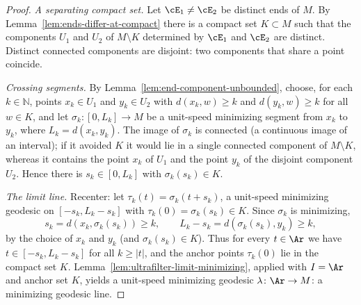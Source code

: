 \begin{proof}
\leanok
{}
{\em A separating compact set.} Let $\cE_1\neq\cE_2$ be distinct
ends of $M$. By Lemma~\ref{lem:ends-differ-at-compact} there is a
compact set $K\subset M$ such that the components $U_1$ and $U_2$
of $M\setminus K$ determined by $\cE_1$ and $\cE_2$ are distinct.
Distinct connected components are disjoint: two components that
share a point coincide.

{\em Crossing segments.} By
Lemma~\ref{lem:end-component-unbounded}, choose, for each
$k\in\mathbb{N}$, points
$x_k\in U_1$ and $y_k\in U_2$ with $d(x_k,w)\ge k$ and $d(y_k,w)\ge
k$ for all $w\in K$, and let $\sigma_k\colon[0,L_k]\to M$ be a
unit-speed minimizing segment from $x_k$ to $y_k$, where
$L_k=d(x_k,y_k)$. The image of $\sigma_k$ is connected (a
continuous image of an interval); if it avoided $K$ it would lie in
a single connected component of $M\setminus K$, whereas it contains
the point $x_k$ of $U_1$ and the point $y_k$ of the disjoint
component $U_2$. Hence there is $s_k\in[0,L_k]$ with
$\sigma_k(s_k)\in K$.

{\em The limit line.} Recenter: let $\tau_k(t)=\sigma_k(t+s_k)$, a
unit-speed minimizing geodesic on $[-s_k,L_k-s_k]$ with
$\tau_k(0)=\sigma_k(s_k)\in K$. Since $\sigma_k$ is minimizing,
$$s_k=d(x_k,\sigma_k(s_k))\ge k,\qquad
L_k-s_k=d(\sigma_k(s_k),y_k)\ge k,$$
by the choice of $x_k$ and $y_k$ (and $\sigma_k(s_k)\in K$). Thus
for every $t\in\Ar$ we have $t\in[-s_k,L_k-s_k]$ for all $k\ge|t|$,
and the anchor points $\tau_k(0)$ lie in the compact set $K$.
Lemma~\ref{lem:ultrafilter-limit-minimizing}, applied with $I=\Ar$
and anchor set $K$, yields a unit-speed minimizing geodesic
$\lambda\colon\Ar\to M$: a minimizing geodesic line.
\end{proof}

